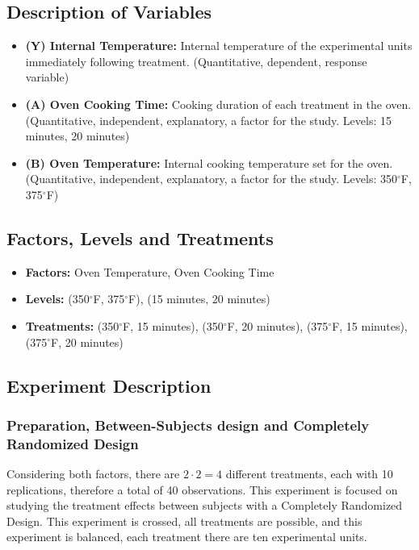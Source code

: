 \documentclass[a4paper]{article}
\begin{document}
\subsection{Description of Variables}\label{Description}
\vspace{-0.25cm}
\begin{itemize}
	\item{\textbf{(Y) Internal Temperature: }Internal temperature of the experimental units immediately following treatment. (Quantitative, dependent, response variable)}
    \item{\textbf{(A) Oven Cooking Time: }Cooking duration of each treatment in the oven. (Quantitative, independent, explanatory, a factor for the study. Levels: 15 minutes, 20 minutes)}
    \item{\textbf{(B) Oven Temperature: }Internal cooking temperature set for the oven. (Quantitative, independent, explanatory, a factor for the study. Levels: 350$^{\circ}$F, 375$^{\circ}$F)}


\end{itemize}
\subsection{Factors, Levels and Treatments}\label{Factors}
\vspace{-0.25cm}
\begin{itemize}
    \item{\textbf{Factors: }Oven Temperature, Oven Cooking Time}
    \item{\textbf{Levels: }(350$^{\circ}$F, 375$^{\circ}$F), (15 minutes, 20 minutes)}
    \item{\textbf{Treatments: }(350$^{\circ}$F, 15 minutes), (350$^{\circ}$F, 20 minutes), (375$^{\circ}$F, 15 minutes), (375$^{\circ}$F, 20 minutes)}
\end{itemize}
\subsection{Experiment Description}\label{Experiment Description}
\vspace{-0.25cm}
\subsubsection{Preparation, Between-Subjects design and Completely Randomized Design}\label{Preparation}
\vspace{-0.25cm}
\hspace{0.5cm}Considering both factors, there are $2 \cdot 2 = 4$ different treatments, each with 10 replications, therefore a total of 40 observations. This experiment is focused on studying the treatment effects between subjects with a Completely Randomized Design. This experiment is crossed, all treatments are possible, and this experiment is balanced, each treatment there are ten experimental units. 
\end{document}
